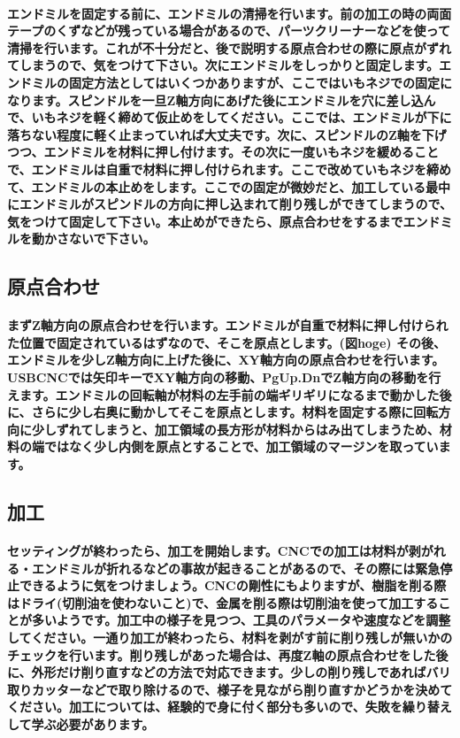 \documentclass[b5paper, 9pt, twocolumn, titlepage,openany]{jsbook}%
\begin{document}
\paragraph{エンドミルを固定する前に、エンドミルの清掃を行います。前の加工の時の両面テープのくずなどが残っている場合があるので、パーツクリーナーなどを使って清掃を行います。これが不十分だと、後で説明する原点合わせの際に原点がずれてしまうので、気をつけて下さい。次にエンドミルをしっかりと固定します。エンドミルの固定方法としてはいくつかありますが、ここではいもネジでの固定になります。スピンドルを一旦Z軸方向にあげた後にエンドミルを穴に差し込んで、いもネジを軽く締めて仮止めをしてください。ここでは、エンドミルが下に落ちない程度に軽く止まっていれば大丈夫です。次に、スピンドルのZ軸を下げつつ、エンドミルを材料に押し付けます。その次に一度いもネジを緩めることで、エンドミルは自重で材料に押し付けられます。ここで改めていもネジを締めて、エンドミルの本止めをします。ここでの固定が微妙だと、加工している最中にエンドミルがスピンドルの方向に押し込まれて削り残しができてしまうので、気をつけて固定して下さい。本止めができたら、原点合わせをするまでエンドミルを動かさないで下さい。}

\subsection{原点合わせ}
\paragraph{まずZ軸方向の原点合わせを行います。エンドミルが自重で材料に押し付けられた位置で固定されているはずなので、そこを原点とします。(図hoge) その後、エンドミルを少しZ軸方向に上げた後に、XY軸方向の原点合わせを行います。USBCNCでは矢印キーでXY軸方向の移動、PgUp.DnでZ軸方向の移動を行えます。エンドミルの回転軸が材料の左手前の端ギリギリになるまで動かした後に、さらに少し右奥に動かしてそこを原点とします。材料を固定する際に回転方向に少しずれてしまうと、加工領域の長方形が材料からはみ出てしまうため、材料の端ではなく少し内側を原点とすることで、加工領域のマージンを取っています。}

\subsection{加工}
\paragraph{セッティングが終わったら、加工を開始します。CNCでの加工は材料が剥がれる・エンドミルが折れるなどの事故が起きることがあるので、その際には緊急停止できるように気をつけましょう。CNCの剛性にもよりますが、樹脂を削る際はドライ(切削油を使わないこと)で、金属を削る際は切削油を使って加工することが多いようです。加工中の様子を見つつ、工具のパラメータや速度などを調整してください。一通り加工が終わったら、材料を剥がす前に削り残しが無いかのチェックを行います。削り残しがあった場合は、再度Z軸の原点合わせをした後に、外形だけ削り直すなどの方法で対応できます。少しの削り残しであればバリ取りカッターなどで取り除けるので、様子を見ながら削り直すかどうかを決めてください。加工については、経験的で身に付く部分も多いので、失敗を繰り替えして学ぶ必要があります。}
\end{document}
